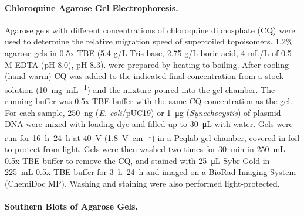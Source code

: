 \documentclass[10pt,a4]{article}
\newcommand{\ugml}{\micro\gram\per\milli\liter}
\newcommand{\mL}{\milli\liter}
\newcommand{\scyst}{\textit{Synechocystis}}
\newcommand{\remove}[1]{\begingroup\color{gray}\endgroup}
\begin{document}
\remove{To test plasmid relaxation by topoisomerase I pooled samples
  from light and dark phases were split and for each reaction
  \SI{10}{\uL} of plasmid extracts were mixed with \SI{5}{\uL} 3x
  reaction buffer (150 mM Tris, 150 mM KCl, 30 mM MgCl2 , 1.5 mM DTT,
  0.3 mM EDTA, \SI{90}{\ugml} BSA) with or without 1 U of TopoI
  (Invitrogen, Cat. no. 38042-024). The reactions were incubated at
  \SI{37}{\celsius} and stopped after the indicated times by addition
  of \SI{3}{\uL} of 6x DNA loading dye with \SI{1}{\percent} SDS at
  \SI{80}{\celsius} for \SI{15}{\minute}. The resulting \SI{18}{\uL}
  were loaded onto the agarose gel (Fig. \ref{fig:diurnalcq}E).}

\paragraph{Chloroquine Agarose Gel Electrophoresis.}
Agarose gels with different concentrations of chloroquine diphosphate
(CQ) were used to determine the relative migration speed of
supercoiled topoisomers. 1.2\% agarose gels in 0.5x TBE (5.4 g/L Tris
base, 2.75 g/L boric acid, 4 mL/L of 0.5 M EDTA (pH 8.0), pH 8.3).
were prepared by heating to boiling. After cooling (hand-warm) CQ was
added to the indicated final concentration from a stock solution
(\SI{10}{\milli\gram\per\milli\liter}) and the mixture poured into the
gel chamber. The running buffer was 0.5x TBE buffer with the same CQ
concentration as the gel. For each sample, \SI{250}{\ng}
(\textit{E. coli}/pUC19) or \SI{1}{\ug} (\scyst{}) of plasmid DNA were
mixed with loading dye and filled up to \SI{30}{\uL} with water.  Gels
were run for \SIrange{16}{24}{\hour} at \SI{40}{\volt}
(\SI{1.8}{\volt\per\cm}) in a Peqlab gel chamber, covered in foil to
protect from light. Gels were then washed two times for
\SI{30}{\minute} in \SI{250}{\mL} 0.5x TBE buffer to remove the CQ,
and stained with \SI{25}{\uL} Sybr Gold in \SI{225}{\mL} 0.5x TBE
buffer for \SIrange{3}{24}{\hour} and imaged on a BioRad Imaging
System (ChemiDoc MP). Washing and staining were also performed
light-protected.

\paragraph{Southern Blots of Agarose Gels.}
\end{document}
